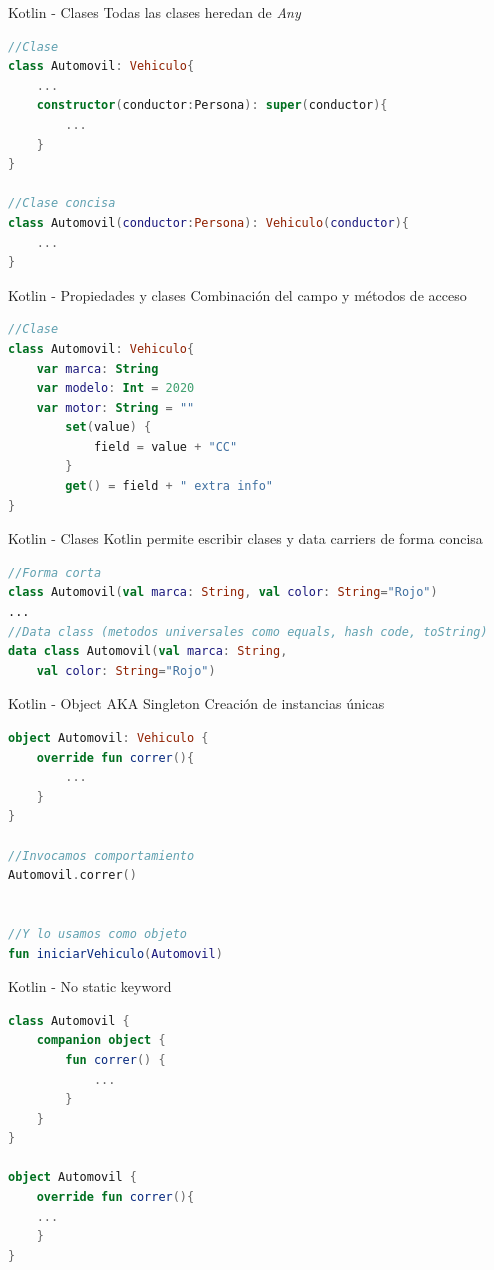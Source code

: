 \documentclass[aspectratio=169]{beamer}
\begin{document}
\begin{frame}[fragile]{Kotlin - Clases}
Todas las clases heredan de \textit{Any}
\begin{lstlisting}[language=Kotlin]
//Clase
class Automovil: Vehiculo{
    ...
    constructor(conductor:Persona): super(conductor){
        ...
    }
}

//Clase concisa
class Automovil(conductor:Persona): Vehiculo(conductor){
    ...
}
\end{lstlisting}

\end{frame}

\begin{frame}[fragile]{Kotlin - Propiedades y clases}
Combinación del campo y métodos de acceso
\begin{lstlisting}[language=Kotlin]
//Clase
class Automovil: Vehiculo{
    var marca: String
    var modelo: Int = 2020
    var motor: String = ""
        set(value) {
            field = value + "CC"
        }
        get() = field + " extra info"
}
\end{lstlisting}

\end{frame}

\begin{frame}[fragile]{Kotlin - Clases}
Kotlin permite escribir clases y data carriers de forma concisa
\begin{lstlisting}[language=Kotlin]
//Forma corta
class Automovil(val marca: String, val color: String="Rojo")
...
//Data class (metodos universales como equals, hash code, toString)
data class Automovil(val marca: String,
    val color: String="Rojo")
\end{lstlisting}

\end{frame}


\begin{frame}[fragile]{Kotlin - Object AKA Singleton}
Creación de instancias únicas
\begin{lstlisting}[language=Kotlin]
object Automovil: Vehiculo {
    override fun correr(){
        ...
    }
}

//Invocamos comportamiento
Automovil.correr()


//Y lo usamos como objeto
fun iniciarVehiculo(Automovil)
\end{lstlisting}

\end{frame}

\begin{frame}[fragile]{Kotlin - No static keyword}

\begin{lstlisting}[language=Kotlin]
class Automovil {
    companion object {
        fun correr() {
            ...
        }
    }
}

object Automovil {
    override fun correr(){
    ...
    }
}
\end{lstlisting}

\end{frame}
\end{document}
